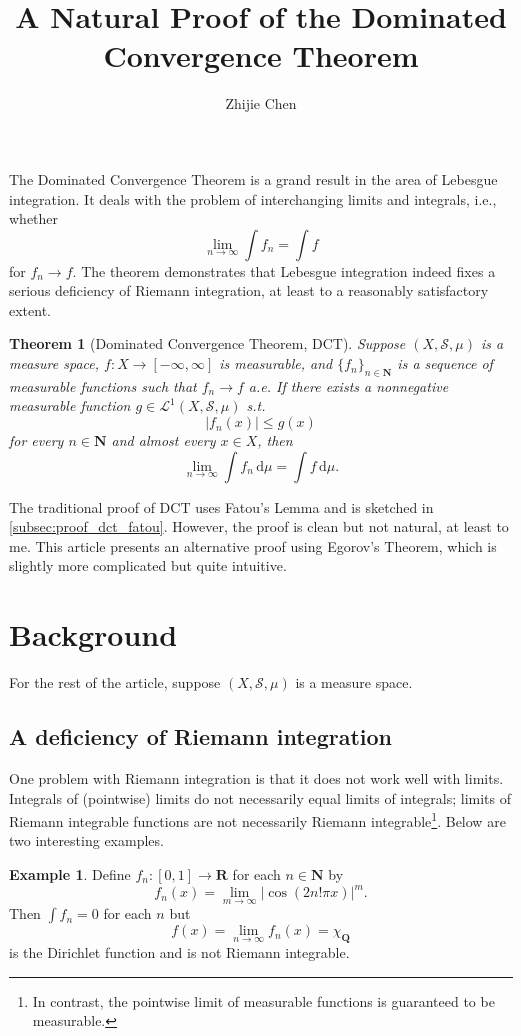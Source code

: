 \documentclass[11pt,a4paper]{article}
\title{A Natural Proof of the Dominated Convergence Theorem}
\author{Zhijie Chen}
\theoremstyle{plain} %
\newtheorem*{theorem}{Theorem}
\theoremstyle{definition}
\newtheorem*{example}{Example}
\theoremstyle{remark}
\newcommand{\abs}[1]{\mathopen{}\left|#1\right|}
\newcommand{\R}{\mathbf{R}}
\newcommand{\N}{\mathbf{N}}
\newcommand{\Q}{\mathbf{Q}}
\renewcommand{\d}{\mathrm{d}}
\renewcommand{\L}{\mathcal{L}}
\renewcommand{\S}{\mathcal{S}}
\newcommand{\nti}{n\to\infty}
\begin{document}
\maketitle

The Dominated Convergence Theorem is a grand result in the area of Lebesgue integration. It deals with the problem of interchanging limits and integrals, i.e., whether
\[\lim_{\nti}\int f_n=\int f\]
for $f_n\to f$. The theorem demonstrates that Lebesgue integration indeed fixes a serious deficiency of Riemann integration, at least to a reasonably satisfactory extent.

\begin{theorem}[Dominated Convergence Theorem, DCT]
    Suppose $(X,\S,\mu)$ is a measure space, $f:X\to[-\infty,\infty]$ is measurable, and $\{f_n\}_{n\in\N}$ is a sequence of measurable functions such that $f_n\to f$ a.e. If there exists a nonnegative measurable function $g\in\L^1(X,\S,\mu)$ s.t.
    \[\abs{f_n(x)}\le g(x)\]
    for every $n\in\N$ and almost every $x\in X$, then
    \[\lim_{\nti}\int f_n\,\d\mu=\int f\,\d\mu.\]
\end{theorem}

The traditional proof of DCT uses Fatou's Lemma and is sketched in \ref{subsec:proof_dct_fatou}. However, the proof is clean but not natural, at least to me. This article presents an alternative proof using Egorov's Theorem, which is slightly more complicated but quite intuitive.

\section{Background}
For the rest of the article, suppose $(X,\S,\mu)$ is a measure space.

\subsection{A deficiency of Riemann integration}
One problem with Riemann integration is that it does not work well with limits. Integrals of (pointwise) limits do not necessarily equal limits of integrals; limits of Riemann integrable functions are not necessarily Riemann integrable\footnote{In contrast, the pointwise limit of measurable functions is guaranteed to be measurable.}. Below are two interesting examples.

\begin{example}
    Define $f_n:[0,1]\to\R$ for each $n\in\N$ by
    \[f_n(x)=\lim_{m\to\infty}\abs{\cos(2n!\pi x)}^m.\]
    Then $\int f_n=0$ for each $n$ but
    \[f(x)=\lim_{\nti}f_n(x)=\chi_\Q\]
    is the Dirichlet function and is not Riemann integrable.
\end{example}
\end{document}
